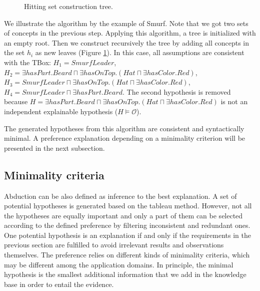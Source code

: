 \documentclass{article}
\begin{document}
\begin{figure}
\centering
{}
\caption{Hitting set construction tree.\label{fig:hittingtree}}
\end{figure}
We illustrate the algorithm by the example of Smurf. Note that we got two sets of concepts in the previous step.
Applying this algorithm, a tree is initialized with an empty root. Then we construct recursively the tree by adding all concepts
in the set $h_i$ as new leaves (Figure \ref{fig:hittingtree}). In this case, all
assumptions are consistent with the TBox:
$H_1=SmurfLeader$, $H_2=\exists hasPart.Beard \sqcap \exists hasOnTop.(Hat\sqcap\exists hasColor.Red)$, 
$H_3=SmurfLeader\sqcap\exists hasOnTop.(Hat\sqcap \exists hasColor.Red)$, $H_4=SmurfLeader \sqcap \exists hasPart.Beard$. 
The second hypothesis is removed because $H=\exists hasPart.Beard \sqcap \exists hasOnTop.(Hat\sqcap\exists hasColor.Red)$ 
is not an independent explainable hypothesis ($H\vDash \mathcal{O}$). 

The generated hypotheses from this algorithm are consistent and syntactically minimal. 
A preference explanation depending on a minimality criterion will be presented in the next subsection.

\subsection{Minimality criteria}
Abduction can be also defined as inference to the best explanation. A set of potential hypotheses is generated based on the tableau method. 
However, not all the hypotheses are equally important and only a part of them can be selected according to the defined preference by filtering inconsistent and redundant ones. 
One potential hypothesis is an explanation if and only if the requirements in the previous section are fulfilled to avoid irrelevant results and observations themselves.
The preference relies on different kinds of minimality criteria, which may be different among the application domains.
In principle, the minimal hypothesis is the smallest additional information that we add in the knowledge base in order to entail the evidence.
\end{document}
